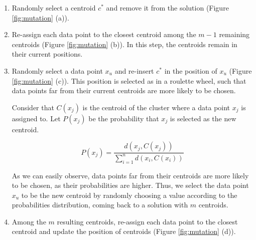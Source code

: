 \begin{enumerate}

	\item Randomly select a centroid $c^{*}$ and remove it from the solution (Figure \ref{fig:mutation} (a)).
	
	\item Re-assign each data point to the closest centroid among the $m-1$ remaining centroids (Figure \ref{fig:mutation} (b)). In this step, the centroids remain in their current positions.
	
	\item Randomly select a data point $x_u$ and re-insert $c^{*}$ in the position of $x_u$ (Figure \ref{fig:mutation} (c)). This position is selected as in a roulette wheel, such that data points far from their current centroids are more likely to be chosen.
	
	
	Consider that $C(x_j)$ is the centroid of the cluster where a data point $x_j$ is assigned to. Let $P(x_j)$ be the probability that $x_j$ is selected as the new centroid.

	\begin{equation}
	P(x_j) = \frac{d(x_j, C(x_j))}{\sum_{i=1}^{n}d(x_i, C(x_i))}
	\end{equation}
	
	
	
	

	As we can easily observe, data points far from their centroids are more likely to be chosen, as their probabilities are higher. Thus, we select the data point $x_u$ to be the new centroid by randomly choosing a value according to the probabilities distribution, coming back to a solution with $m$ centroids.
	
	\item Among the $m$ resulting centroids, re-assign each data point to the closest centroid and update the position of centroids (Figure \ref{fig:mutation} (d)).
		
\end{enumerate}

